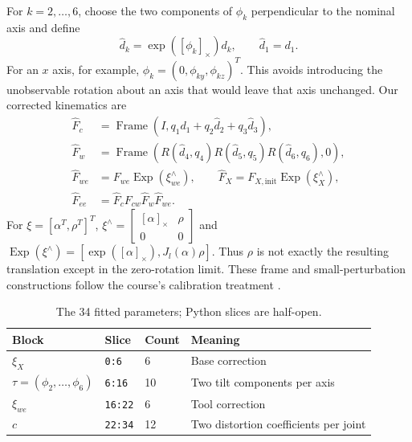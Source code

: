 \documentclass[11pt]{article}
\newcommand{\Frame}{\operatorname{Frame}}
\newcommand{\Exp}{\operatorname{Exp}}
\begin{document}
For $k=2,\ldots,6$, choose the two components of $\phi_k$ perpendicular to the nominal axis and define
\begin{equation}
 \widehat d_k=\exp([\phi_k]_\times)d_k,\qquad \widehat d_1=d_1.
\end{equation}
For an $x$ axis, for example, $\phi_k=(0,\phi_{ky},\phi_{kz})^T$. This avoids introducing the unobservable rotation about an axis that would leave that axis unchanged. Our corrected kinematics are
\begin{align}
 \widehat F_c&=\Frame(I,q_1d_1+q_2\widehat d_2+q_3\widehat d_3),\\
 \widehat F_w&=\Frame(R(\widehat d_4,q_4)R(\widehat d_5,q_5)R(\widehat d_6,q_6),0),\\
 \widehat F_{we}&=F_{we}\Exp(\xi_{we}^{\wedge}),\qquad
 \widehat F_X=F_{X,\mathrm{init}}\Exp(\xi_X^{\wedge}),\\
 \widehat F_{ee}&=\widehat F_c F_{cw}\widehat F_w\widehat F_{we}.
 \label{eq:corrected}
\end{align}
For $\xi=[\alpha^T,\rho^T]^T$, $\xi^\wedge=\left[\begin{smallmatrix}[\alpha]_\times&\rho\\0&0\end{smallmatrix}\right]$ and $\Exp(\xi^\wedge)=[\exp([\alpha]_\times),J_l(\alpha)\rho]$. Thus $\rho$ is not exactly the resulting translation except in the zero-rotation limit. These frame and small-perturbation constructions follow the course's calibration treatment \cite{frames,calibration}.

\begin{table}[H]\centering\small
\caption{The 34 fitted parameters; Python slices are half-open.}
\begin{tabular}{@{}llll@{}}\toprule
Block & Slice & Count & Meaning\\\midrule
$\xi_X$ & \texttt{0:6} & 6 & Base correction\\
$\tau=(\phi_2,\ldots,\phi_6)$ & \texttt{6:16} & 10 & Two tilt components per axis\\
$\xi_{we}$ & \texttt{16:22} & 6 & Tool correction\\
$c$ & \texttt{22:34} & 12 & Two distortion coefficients per joint\\\bottomrule
\end{tabular}\end{table}
\end{document}

